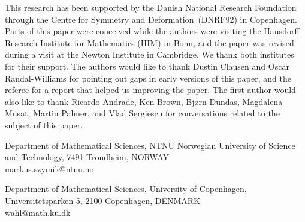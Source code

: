 \documentclass[10pt]{article}
\theoremstyle{definition}
\numberwithin{theorem}{section}
\numberwithin{equation}{section}
\numberwithin{figure}{section}
\begin{document}
This research has been supported by the Danish National Research
Foundation through the Centre for Symmetry and Deformation~(DNRF92) in
Copenhagen. Parts of this paper were conceived while the authors were
visiting the Hausdorff Research Institute for Mathematics (HIM) in
Bonn, and the paper was revised during a visit at the Newton Institute in Cambridge. We thank both institutes for their support. The authors would like to thank Dustin Clausen and Oscar Randal-Williams for pointing out gaps in early versions of this paper, and the referee for a report that helped us improving the paper. The first author would also like to thank Ricardo Andrade, Ken Brown, Bj\o{}rn Dundas, Magdalena Musat, Martin Palmer, and Vlad Sergiescu for conversations related to the subject of this paper. 





\vfill

Department of Mathematical Sciences, 
NTNU Norwegian University of Science and Technology,
7491 Trondheim,
NORWAY\\
\href{mailto:markus.szymik@ntnu.no}{markus.szymik@ntnu.no}

Department of Mathematical Sciences, 
University of Copenhagen, 
Universitets\-parken 5, 
2100 Copenhagen,
DENMARK\\
\href{mailto:wahl@math.ku.dk}{wahl@math.ku.dk}

\end{document}
